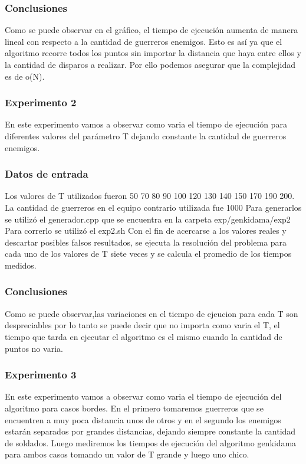     	\subsubsection*{Conclusiones}\;
			Como se puede observar en el gráfico, el tiempo de ejecución aumenta de manera lineal con respecto a la cantidad de guerreros enemigos. Esto es así ya que el algoritmo recorre todos los puntos sin importar la distancia que haya entre ellos y la cantidad de disparos a realizar. Por ello podemos asegurar que la complejidad es de o(N).\;
			\;


		\subsubsection*{Experimento 2}\;
			En este experimento vamos a observar como varia el tiempo de ejecución para diferentes valores del parámetro T dejando constante la cantidad de guerreros enemigos.\;

		\subsubsection*{Datos de entrada}\;

		Los valores de T utilizados fueron 50 70 80 90 100 120 130 140 150 170 190 200.\;
		La cantidad de guerreros en el equipo contrario utilizada fue 1000
		Para generarlos se utilizó el generador.cpp que se encuentra en la carpeta exp/genkidama/exp2\;
		Para correrlo se utilizó el exp2.sh \;
		Con el fin de acercarse a los valores reales y descartar posibles falsos resultados, se ejecuta la resolución del problema para cada uno de los valores de T siete veces y se calcula el promedio de los tiempos medidos.\;
    	
    	\subsubsection*{Conclusiones}\;

		Como se puede observar,las variaciones en el tiempo de ejeucion para cada T son despreciables por lo tanto se puede decir que no importa como varia el T, el tiempo que tarda en ejecutar el algoritmo es el mismo cuando la cantidad de puntos no varia.\;
		\;

    	\subsubsection*{Experimento 3}\;

		En este experimento vamos a observar como varia el tiempo de ejecución del algoritmo para casos bordes. En el primero tomaremos guerreros que se encuentren a muy poca distancia  unos de otros y en el segundo los enemigos estarán separados por grandes distancias, dejando siempre constante la cantidad de soldados. Luego mediremos los tiempos de ejecución del algoritmo genkidama para ambos casos tomando un valor de T grande y luego uno chico.\;
		
